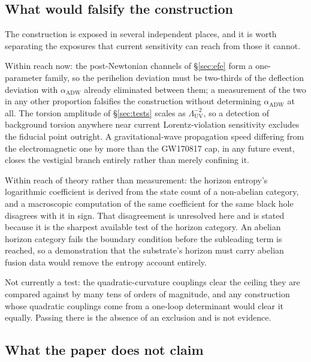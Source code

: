 \documentclass[aps,prd,nofootinbib,superscriptaddress,12pt]{revtex4-2}
\begin{document}
\subsection{What would falsify the construction}
\label{sec:scope-falsifiers}

The construction is exposed in several independent places, and it is worth
separating the exposures that current sensitivity can reach from those it
cannot.

Within reach now: the post-Newtonian channels of \S\ref{sec:efe} form a
one-parameter family, so the perihelion deviation must be two-thirds of the
deflection deviation with $\alpha_{\mathrm{ADW}}$ already eliminated between
them; a measurement of the two in any other proportion falsifies the
construction without determining $\alpha_{\mathrm{ADW}}$ at all. The torsion
amplitude of \S\ref{sec:tests} scales as $\Lambda_{\mathrm{UV}}^{-2}$, so a
detection of background torsion anywhere near current Lorentz-violation
sensitivity excludes the fiducial point outright. A gravitational-wave
propagation speed differing from the electromagnetic one by more than the
GW170817 cap, in any future event, closes the vestigial branch entirely rather
than merely confining it.

Within reach of theory rather than measurement: the horizon entropy's
logarithmic coefficient is derived from the state count of a non-abelian
category, and a macroscopic computation of the same coefficient for the same
black hole disagrees with it in sign. That disagreement is unresolved here and
is stated because it is the sharpest available test of the horizon category. An
abelian horizon category fails the boundary condition before the subleading term
is reached, so a demonstration that the substrate's horizon must carry abelian
fusion data would remove the entropy account entirely.

Not currently a test: the quadratic-curvature couplings clear the ceiling they
are compared against by many tens of orders of magnitude, and any construction
whose quadratic couplings come from a one-loop determinant would clear it
equally. Passing there is the absence of an exclusion and is not evidence.

\subsection{What the paper does not claim}
\label{sec:scope-nonclaims}
\end{document}
